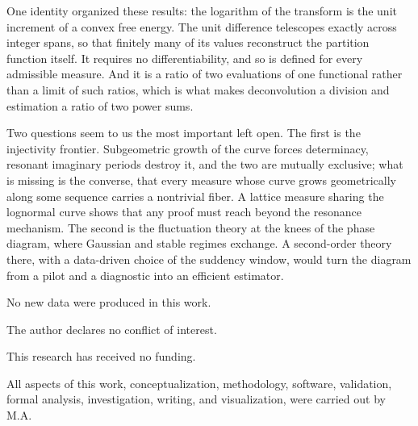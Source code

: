 \documentclass[sn-mathphys-num]{sn-jnl}
\theoremstyle{thmstyleone}%
\theoremstyle{thmstyletwo}%
\theoremstyle{thmstylethree}%
\theoremstyle{thmstyleone}%
\begin{document}
	One identity organized these results: the logarithm of the transform
	is the unit increment of a convex free energy. The unit difference
	telescopes exactly across integer spans, so that finitely many of its
	values reconstruct the partition function itself. It requires no
	differentiability, and so is defined for every admissible measure.
	And it is a ratio of two evaluations of one functional rather than a
	limit of such ratios, which is what makes deconvolution a division
	and estimation a ratio of two power sums.
	
	Two questions seem to us the most important left open. The first is
	the injectivity frontier. Subgeometric growth of the curve forces
	determinacy, resonant imaginary periods destroy it, and the two are
	mutually exclusive; what is missing is the converse, that every
	measure whose curve grows geometrically along some sequence carries a
	nontrivial fiber. A lattice measure sharing the lognormal curve shows
	that any proof must reach beyond the resonance mechanism. The second
	is the fluctuation theory at the knees of the phase diagram, where
	Gaussian and stable regimes exchange. A second-order theory there,
	with a data-driven choice of the suddency window, would turn the
	diagram from a pilot and a diagnostic into an efficient estimator.
	
	No new data were produced in this work.
	
	The author declares no conflict of interest.
	
	This research has received no funding.
	
	All aspects of this work, conceptualization, methodology, software,
	validation, formal analysis, investigation, writing, and
	visualization, were carried out by M.A.
	
\end{document}
